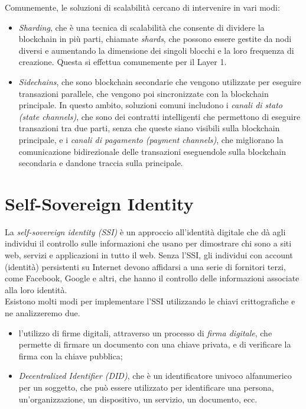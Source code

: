 Comunemente, le soluzioni di scalabilità cercano di intervenire in vari modi:
\begin{itemize}
    \item{\textit{Sharding}}, che è una tecnica di scalabilità che consente di dividere la blockchain in più parti, chiamate \textit{shards}, che possono essere gestite da nodi diversi e aumentando
    la dimensione dei singoli blocchi e la loro frequenza di creazione. Questa si effettua comunemente per il Layer 1.
    \item{\textit{Sidechains}}, che sono blockchain secondarie che vengono utilizzate per eseguire transazioni parallele, che vengono poi sincronizzate con la blockchain principale.
    In questo ambito, soluzioni comuni includono i \textit{canali di stato (state channels)}, che sono dei contratti intelligenti che permettono di eseguire transazioni tra due parti, senza che queste siano visibili sulla blockchain principale,
    e i \textit{canali di pagamento (payment channels)}, che migliorano la comunicazione bidirezionale delle transazioni eseguendole sulla blockchain secondaria e dandone traccia sulla principale.
\end{itemize}

\newpage

\section{Self-Sovereign Identity}\label{sec:self-sovereign-identity}

La \textit{self-sovereign identity (SSI)} è un approccio all'identità digitale che dà agli individui 
il controllo sulle informazioni che usano per dimostrare chi sono a siti web, servizi e applicazioni in tutto il web. 
Senza l'SSI, gli individui con account (identità) persistenti su Internet devono affidarsi a una serie di fornitori terzi, come Facebook, Google e altri,
che hanno il controllo delle informazioni associate alla loro identità. \\

Esistono molti modi per implementare l'SSI utilizzando le chiavi crittografiche e ne analizzeremo due.
\begin{itemize}
    \item l'utilizzo di firme digitali, attraverso un processo di \textit{firma digitale}, che permette di firmare un documento con una chiave privata, e di verificare la firma con la chiave pubblica;
    \item \textit{Decentralized Identifier (DID)}, che è un identificatore univoco alfanumerico per un soggetto, che può essere utilizzato per identificare una persona, un'organizzazione, un dispositivo, un servizio, un documento, ecc.
\end{itemize}  

